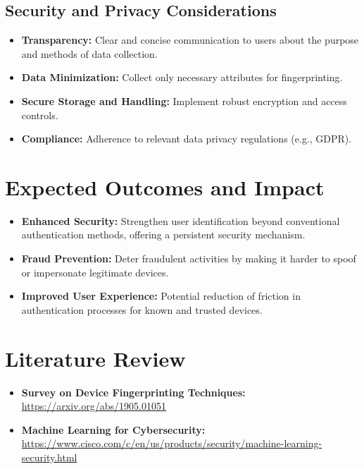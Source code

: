 \documentclass{article}
\begin{document}
\subsection{Security and Privacy Considerations}
\begin{itemize}
    \item \textbf{Transparency:} Clear and concise communication to users about the purpose and methods of data collection.
    \item \textbf{Data Minimization:} Collect only necessary attributes for fingerprinting.
    \item \textbf{Secure Storage and Handling:} Implement robust encryption and access controls.
    \item \textbf{Compliance:} Adherence to relevant data privacy regulations (e.g., GDPR).
\end{itemize}

\section{Expected Outcomes and Impact}
\begin{itemize}
    \item \textbf{Enhanced Security:} Strengthen user identification beyond conventional authentication methods, offering a persistent security mechanism.
    \item \textbf{Fraud Prevention:} Deter fraudulent activities by making it harder to spoof or impersonate legitimate devices.
    \item \textbf{Improved User Experience:} Potential reduction of friction in authentication processes for known and trusted devices.
\end{itemize}

\section{Literature Review}
\begin{itemize}
    \item \textbf{Survey on Device Fingerprinting Techniques:} \url{https://arxiv.org/abs/1905.01051}
    \item \textbf{Machine Learning for Cybersecurity:} \url{https://www.cisco.com/c/en/us/products/security/machine-learning-security.html}
\end{itemize}
\end{document}
